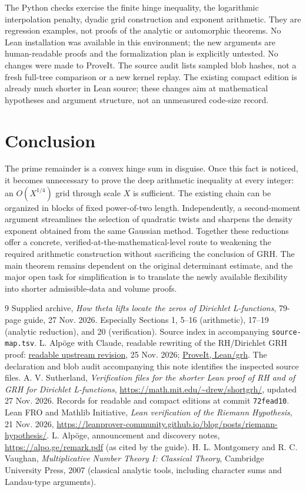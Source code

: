 \documentclass[11pt,a4paper]{article}
\theoremstyle{remark}\newtheorem{remark}[theorem]{Remark}
\newcommand{\upstream}{\href{https://github.com/lsernau/grh-lean/tree/72fead102f663d5c7a407964a13dc0cf9d977207/grh}{readable upstream revision}}
\newcommand{\repo}{\href{https://github.com/VladimirReshetnikov/ProveIt/tree/main/Analysis/GeneralizedRiemannHypothesis/Lean/grh}{ProveIt, Lean/grh}}
\begin{document}
The Python checks exercise the finite hinge inequality, the logarithmic interpolation penalty, dyadic grid construction and exponent arithmetic. They are regression examples, not proofs of the analytic or automorphic theorems. No Lean installation was available in this environment; the new arguments are human-readable proofs and the formalization plan is explicitly untested. No changes were made to ProveIt. The source audit lists sampled blob hashes, not a fresh full-tree comparison or a new kernel replay. The existing compact edition \cite{sutherland} is already much shorter in Lean source; these changes aim at mathematical hypotheses and argument structure, not an unmeasured code-size record.

\section*{Conclusion}
The prime remainder is a convex hinge sum in disguise. Once this fact is noticed, it becomes unnecessary to prove the deep arithmetic inequality at every integer: an $O(X^{1/4})$ grid through scale $X$ is sufficient. The existing chain can be organized in blocks of fixed power-of-two length. Independently, a second-moment argument streamlines the selection of quadratic twists and sharpens the density exponent obtained from the same Gaussian method. Together these reductions offer a concrete, verified-at-the-mathematical-level route to weakening the required arithmetic construction without sacrificing the conclusion of GRH. The main theorem remains dependent on the original determinant estimate, and the major open task for simplification is to translate the newly available flexibility into shorter admissible-data and volume proofs.

\begin{thebibliography}{9}\small
{} Supplied archive, \emph{How theta lifts locate the zeros of Dirichlet L-functions}, 79-page guide, 27 Nov. 2026. Especially Sections 1, 5--16 (arithmetic), 17--19 (analytic reduction), and 20 (verification). Source index in accompanying \texttt{source-map.tsv}.
 L. Alp\"oge with Claude, readable rewriting of the RH/Dirichlet GRH proof: \upstream, 25 Nov. 2026; \repo. The declaration and blob audit accompanying this note identifies the inspected source files.
 A. V. Sutherland, \emph{Verification files for the shorter Lean proof of RH and of GRH for Dirichlet L-functions}, \url{https://math.mit.edu/~drew/shortgrh/}, updated 27 Nov. 2026. Records for readable and compact editions at commit \texttt{72fead10}.
 Lean FRO and Mathlib Initiative, \emph{Lean verification of the Riemann Hypothesis}, 21 Nov. 2026, \url{https://leanprover-community.github.io/blog/posts/riemann-hypothesis/}.
 L. Alp\"oge, announcement and discovery notes, \url{https://alpo.ge/remark.pdf} (as cited by the guide).
 H. L. Montgomery and R. C. Vaughan, \emph{Multiplicative Number Theory I: Classical Theory}, Cambridge University Press, 2007 (classical analytic tools, including character sums and Landau-type arguments).
\end{thebibliography}
\end{document}
